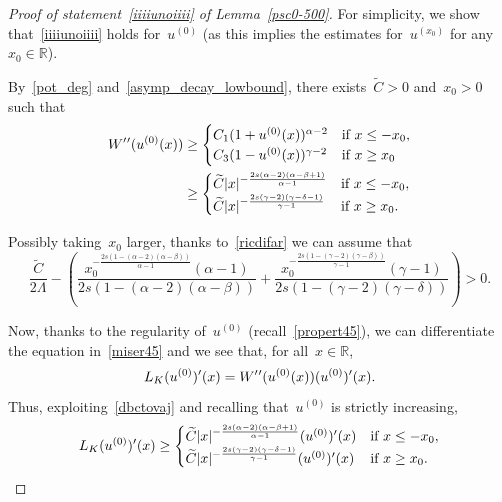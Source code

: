 \documentclass[10pt,a4paper]{amsart}
\numberwithin{equation}{section}
\newcommand{\R}{\mathbb{R}}
\begin{document}
\begin{proof}[Proof of statement~\eqref{iiiiunoiiii} of Lemma~\ref{psc0-500}]
For simplicity, we show that~\eqref{iiiiunoiiii} holds for~$u^{(0)}$
(as this implies the estimates for~$u^{(x_0)}$ for any~$x_0\in\R$). 

By~\eqref{pot_deg} and~\eqref{asymp_decay_lowbound}, there exists~$\widetilde{C}>0$ and~$x_0>0$ such that
\begin{equation}\label{dbctovaj}\begin{split}
W\rq{}\rq{}(u^{(0)}(x)) &\geq 
\begin{cases} C_1
( 1+u^{(0)}(x))^{\alpha-2} &\mbox{if }x\leq -x_0  , \\
C_3( 1-u^{(0)}(x))^{\gamma-2} &\mbox{if } x\geq x_0 
\end{cases}
\\&\geq
\begin{cases}
 \widetilde{C} |x |^{-\frac{2s(\alpha -2)(\alpha-\beta+1)}{\alpha-1}} &\mbox{if }x\leq -x_0 , \\
\widetilde{C}|x |^{-\frac{2s(\gamma-2)(\gamma-\delta-1)}{\gamma-1}} &\mbox{if } x\geq x_0 .
\end{cases}\end{split}
\end{equation}


Possibly taking~$x_0$ larger, thanks to~\eqref{ricdifar} we can assume that
\begin{equation}\label{xyxve}
\frac{\widetilde{C}}{2\Lambda} - \left( \frac{x_0^{-\frac{2s\left(1-(\alpha-2)(\alpha-\beta)\right)}{\alpha-1}}(\alpha-1)}{2s\left(1-(\alpha-2)(\alpha-\beta)\right)} +\frac{x_0^{-\frac{2s\left(1-(\gamma-2)(\gamma-\beta)\right)}{\gamma-1}}(\gamma-1)}{2s\left(1-(\gamma-2)(\gamma-\delta)\right)}\right)>0.
\end{equation}

Now, thanks to the regularity of~$u^{(0)}$ (recall~\eqref{propert45}), we can differentiate the equation
in~\eqref{miser45} and we see that, for all~$x\in\R$,
$$ {L}_K (u^{(0)})\rq{}(x) = W\rq{}\rq{}(u^{(0)}(x))  (u^{(0)})\rq{} (x).$$
Thus, exploiting~\eqref{dbctovaj} and recalling that~$u^{(0)}$
is strictly increasing, 
\begin{equation}\label{jgox}
{L}_K (u^{(0)})\rq{}(x) \geq \begin{cases}
 \widetilde{C}|x |^{-\frac{2s(\alpha -2)(\alpha-\beta+1)}{\alpha-1}} (u^{(0)})\rq{}(x) &\mbox{if } x \le -x_0 ,\\
 \widetilde{C} |x |^{-\frac{2s(\gamma-2)(\gamma-\delta-1)}{\gamma-1}} (u^{(0)})\rq{}(x) &\mbox{if } x \ge x_0.
\end{cases}
\end{equation}


\end{proof}
\end{document}
